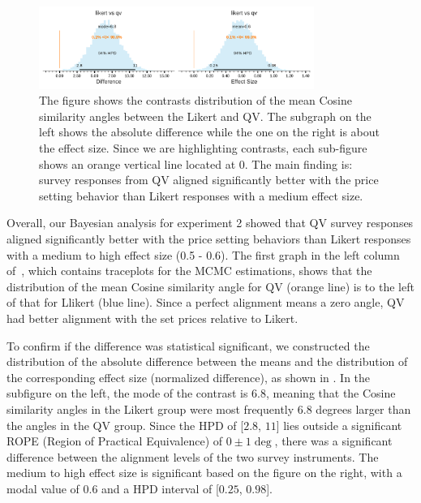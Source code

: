 \begin{figure}[htpb]
  \centering
  \includegraphics[trim= 0in 0in 0in 0in, clip, width=0.8\textwidth, keepaspectratio=true]{"content/image/Votes_Prices_StudentT_differences_and_effects.pdf"}
  \caption{
    The figure shows the contrasts distribution of the mean Cosine similarity angles between the Likert and QV. The subgraph on the left shows the absolute difference while the one on the right is about the effect size. Since we are highlighting contrasts, each sub-figure shows an orange vertical line located at 0. The main finding is: survey responses from QV aligned significantly better with the price setting behavior than Likert responses with a medium effect size.
  }
  \label{fig:contrast_exp2}
\end{figure}

Overall, our Bayesian analysis for experiment 2 showed that QV survey responses aligned significantly better with the price setting behaviors than Likert responses with a medium to high effect size (0.5 - 0.6). The first graph in the left column of~, which contains traceplots for the MCMC estimations, shows that the distribution of the mean Cosine similarity angle for QV (orange line) is to the left of that for Llikert (blue line). Since a perfect alignment means a zero angle, QV had better alignment with the set prices relative to Likert. 

To confirm if the difference was statistical significant, we constructed the distribution of the absolute difference between the means and the distribution of the corresponding effect size (normalized difference), as shown in . In the subfigure on the left, the mode of the contrast is $6.8$, meaning that the Cosine similarity angles in the Likert group were most frequently $6.8$ degrees larger than the angles in the QV group. Since the HPD of [$2.8$, $11$] lies outside a significant ROPE (Region of Practical Equivalence) of $0 \pm 1 \deg$, there was a significant difference between the alignment levels of the two survey instruments. The medium to high effect size is significant based on the figure on the right, with a modal value of $0.6$ and a HPD interval of [$0.25$, $0.98$].


